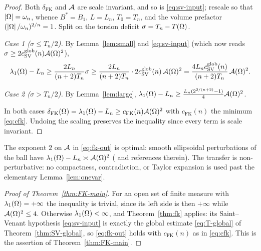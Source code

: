 \begin{proof}
Both $\delta_{\mathrm{FK}}$ and $\mathcal A$ are scale invariant, and so is
\eqref{eq:sv-input}; rescale so that $\left|\Omega\right|=\omega_n$, whence $B^*=B_1$,
$L=L_n$, $T_0=T_n$, and the volume prefactor $(\left|\Omega\right|/\omega_n)^{2/n}=1$.
Split on the torsion deficit $\sigma=T_n-T(\Omega)$.

\emph{Case 1 ($\sigma\le T_n/2$).} By Lemma~\ref{lem:small} and
\eqref{eq:sv-input} (which now reads
$\sigma\ge 2c_{\mathrm{SV}}^{\mathrm{glob}}(n)\mathcal A(\Omega)^2$),
\[
  \lambda_1(\Omega)-L_n
  \ge\frac{2L_n}{(n+2)T_n}\sigma
  \ge\frac{2L_n}{(n+2)T_n}\cdot 2c_{\mathrm{SV}}^{\mathrm{glob}}(n)\,\mathcal A(\Omega)^2
  =\frac{4L_n c_{\mathrm{SV}}^{\mathrm{glob}}(n)}{(n+2)T_n}\,\mathcal A(\Omega)^2 .
\]

\emph{Case 2 ($\sigma>T_n/2$).} By Lemma~\ref{lem:large},
$\lambda_1(\Omega)-L_n\ge\frac{L_n(2^{2/(n+2)}-1)}{4}\mathcal A(\Omega)^2$.

In both cases $\delta_{\mathrm{FK}}(\Omega)=\lambda_1(\Omega)-L_n\ge
c_{\mathrm{FK}}(n)\mathcal A(\Omega)^2$ with $c_{\mathrm{FK}}(n)$ the minimum
\eqref{eq:cfk}. Undoing the scaling preserves the inequality since every
term is scale invariant.
\end{proof}

\begin{remark}\label{rem:sharp}
The exponent $2$ on $\mathcal A$ in \eqref{eq:fk-out} is optimal: smooth
ellipsoidal perturbations of the ball have
$\lambda_1(\Omega)-L_n\asymp\mathcal A(\Omega)^2$
(\cite{BraDeP2017,Brasco2014} and references therein). The transfer is
non-perturbative: no compactness, contradiction, or Taylor expansion is
used past the elementary Lemma~\ref{lem:onevar}.
\end{remark}

\begin{proof}[Proof of Theorem~\ref{thm:FK-main}]
For an open set of finite measure with $\lambda_1(\Omega)=+\infty$ the inequality
is trivial, since its left side is then $+\infty$ while
$\mathcal A(\Omega)^2\le4$.  Otherwise $\lambda_1(\Omega)<\infty$, and
Theorem~\ref{thm:fk} applies: its Saint--Venant hypothesis
\eqref{eq:sv-input} is exactly the global estimate \eqref{eq:T-global} of
Theorem~\ref{thm:SV-global}, so \eqref{eq:fk-out} holds with
$c_{\mathrm{FK}}(n)$ as in \eqref{eq:cfk}.  This is the assertion of
Theorem~\ref{thm:FK-main}.
\end{proof}

